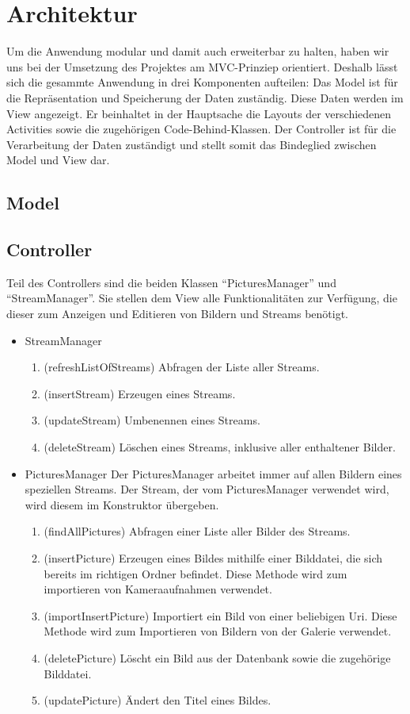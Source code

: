 \chapter{Architektur}

Um die Anwendung modular und damit auch erweiterbar zu halten, haben wir uns bei der Umsetzung des Projektes am MVC-Prinziep orientiert. Deshalb lässt sich die gesammte Anwendung in drei Komponenten aufteilen: Das Model ist für die Repräsentation und Speicherung der Daten zuständig. Diese Daten werden im View angezeigt. Er beinhaltet in der Hauptsache die Layouts der verschiedenen Activities sowie die zugehörigen Code-Behind-Klassen. Der Controller ist für die Verarbeitung der Daten zuständigt und stellt somit das Bindeglied zwischen Model und View dar. 

\section{Model}

\section{Controller}

Teil des Controllers sind die beiden Klassen \enquote{PicturesManager} und \enquote{StreamManager}. Sie stellen dem View alle Funktionalitäten zur Verfügung, die dieser zum Anzeigen und Editieren von Bildern und Streams benötigt.

\begin{itemize}
\item{StreamManager}
\begin{enumerate}
\item (refreshListOfStreams) Abfragen der Liste aller Streams.
\item (insertStream) Erzeugen eines Streams.
\item (updateStream) Umbenennen eines Streams.
\item (deleteStream) Löschen eines Streams, inklusive aller enthaltener Bilder.
\end{enumerate}
\item{PicturesManager} \newline
Der PicturesManager arbeitet immer auf allen Bildern eines speziellen Streams. Der Stream, der vom PicturesManager verwendet wird, wird diesem im Konstruktor übergeben.
\begin{enumerate}
\item (findAllPictures) Abfragen einer Liste aller Bilder des Streams.
\item (insertPicture) Erzeugen eines Bildes mithilfe einer Bilddatei, die sich bereits im richtigen Ordner befindet. Diese Methode wird zum importieren von Kameraaufnahmen verwendet.
\item (importInsertPicture) Importiert ein Bild von einer beliebigen Uri. Diese Methode wird zum Importieren von Bildern von der Galerie verwendet.
\item (deletePicture) Löscht ein Bild aus der Datenbank sowie die zugehörige Bilddatei.
\item (updatePicture) Ändert den Titel eines Bildes.
\end{enumerate}
\end{itemize}

